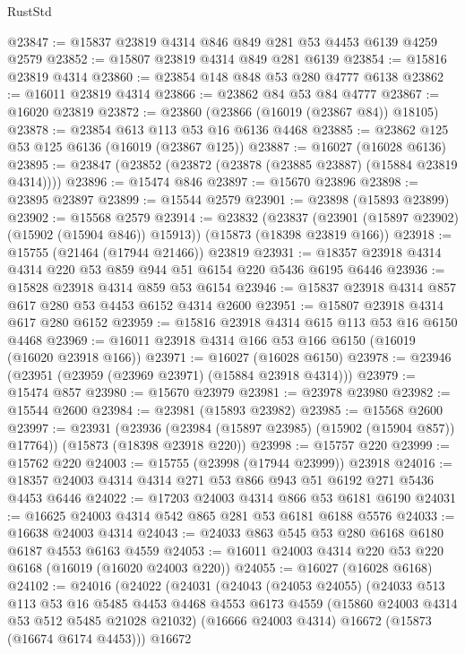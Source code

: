 \begin{lexlean}{RustStd}
\begin{coremodule}
@23847 := @15837 @23819 @4314 @846 @849 @281 @53 @4453 @6139 @4259 @2579
@23852 := @15807 @23819 @4314 @849 @281 @6139
@23854 := @15816 @23819 @4314
@23860 := @23854 @148 @848 @53 @280 @4777 @6138
@23862 := @16011 @23819 @4314
@23866 := @23862 @84 @53 @84 @4777
@23867 := @16020 @23819
@23872 := @23860 (@23866 (@16019 (@23867 @84)) @18105)
@23878 := @23854 @613 @113 @53 @16 @6136 @4468
@23885 := @23862 @125 @53 @125 @6136 (@16019 (@23867 @125))
@23887 := @16027 (@16028 @6136)
@23895 := @23847 (@23852 (@23872 (@23878 (@23885 @23887) (@15884 @23819 @4314))))
@23896 := @15474 @846
@23897 := @15670 @23896
@23898 := @23895 @23897
@23899 := @15544 @2579
@23901 := @23898 (@15893 @23899)
@23902 := @15568 @2579
@23914 := @23832
    (@23837 (@23901 (@15897 @23902) (@15902 (@15904 @846)) @15913))
    (@15873 (@18398 @23819 @166))
@23918 := @15755 (@21464 (@17944 @21466)) @23819
@23931 := @18357 @23918 @4314 @4314 @220 @53 @859 @944 @51 @6154 @220 @5436 @6195 @6446
@23936 := @15828 @23918 @4314 @859 @53 @6154
@23946 := @15837 @23918 @4314 @857 @617 @280 @53 @4453 @6152 @4314 @2600
@23951 := @15807 @23918 @4314 @617 @280 @6152
@23959 := @15816 @23918 @4314 @615 @113 @53 @16 @6150 @4468
@23969 := @16011 @23918 @4314 @166 @53 @166 @6150 (@16019 (@16020 @23918 @166))
@23971 := @16027 (@16028 @6150)
@23978 := @23946 (@23951 (@23959 (@23969 @23971) (@15884 @23918 @4314)))
@23979 := @15474 @857
@23980 := @15670 @23979
@23981 := @23978 @23980
@23982 := @15544 @2600
@23984 := @23981 (@15893 @23982)
@23985 := @15568 @2600
@23997 := @23931
    (@23936 (@23984 (@15897 @23985) (@15902 (@15904 @857)) @17764))
    (@15873 (@18398 @23918 @220))
@23998 := @15757 @220
@23999 := @15762 @220
@24003 := @15755 (@23998 (@17944 @23999)) @23918
@24016 := @18357 @24003 @4314 @4314 @271 @53 @866 @943 @51 @6192 @271 @5436 @4453 @6446
@24022 := @17203 @24003 @4314 @866 @53 @6181 @6190
@24031 := @16625 @24003 @4314 @542 @865 @281 @53 @6181 @6188 @5576
@24033 := @16638 @24003 @4314
@24043 := @24033 @863 @545 @53 @280 @6168 @6180 @6187 @4553 @6163 @4559
@24053 := @16011 @24003 @4314 @220 @53 @220 @6168 (@16019 (@16020 @24003 @220))
@24055 := @16027 (@16028 @6168)
@24102 := @24016
    (@24022
      (@24031
        (@24043
          (@24053 @24055)
          (@24033
            @513
            @113
            @53
            @16
            @5485
            @4453
            @4468
            @4553
            @6173
            @4559
            (@15860 @24003 @4314 @53 @512 @5485 @21028 @21032)
            (@16666 @24003 @4314)
            @16672
            (@15873 (@16674 @6174 @4453)))
          @16672

\end{coremodule}
\end{lexlean}

